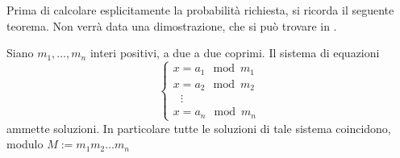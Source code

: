 Prima di calcolare esplicitamente la probabilità richiesta, si ricorda il seguente teorema.
Non verrà data una dimostrazione, che si può trovare in \cite{Book:QCQI}.
\begin{thm}\label{thm:Chinese}
 Siano $m_1, \dots, m_n$ interi positivi, a due a due coprimi.
 Il sistema di equazioni
 \begin{equation}
  \begin{cases}
   x = a_1 \mod m_1\\
   x = a_2 \mod m_2\\
   \ \ \ \vdots\\
   x = a_n \mod m_n
  \end{cases}
 \end{equation}
 ammette soluzioni. In particolare tutte le soluzioni di tale sistema coincidono, modulo $M := m_1m_2 \dots m_n$
\end{thm}

